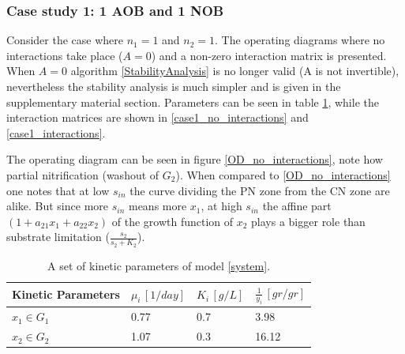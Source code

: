 \documentclass[3p,times]{article}
\begin{document}
\subsubsection{Case study 1: 1 AOB and 1 NOB}

Consider the case where $n_1 = 1$ and $n_2 = 1$. The operating diagrams where no interactions take place ($A = 0$) and a non-zero interaction matrix is presented. When $A=0$ algorithm \ref{StabilityAnalysis} is no longer valid (A is not invertible), nevertheless the stability analysis is much simpler and is given in the supplementary material section. Parameters can be seen in table \ref{kinetic_parameters_case_study_1}, while the interaction matrices are shown in \ref{case1_no_interactions} and \ref{case1_interactions}.

The operating diagram can be seen in figure \ref{OD_no_interactions}, note how partial nitrification (washout of $G_2$). When compared to \ref{OD_no_interactions} one notes that at low $s_{in}$ the curve dividing the PN zone from the CN zone are alike. But since more $s_{in}$ means more $x_1$, at high $s_{in}$ the affine part $(1+ a_{21}x_1 +a_{22}x_2)$ of the growth function of $x_2$ plays a bigger role than substrate limitation ($\frac{s_2}{s_2+K_2}$).


\begin{table}[ht]
	\centering
	\begin{tabular}{|l|l|l|l|}
		\hline
		Kinetic Parameters & $\mu_i\,[1/day]$ & $K_i\,[g/L]$ & $\frac{1}{y_i} \, [gr/gr]$ \\ \hline
		$x_1 \in G_1$ & 0.77  & 0.7 & 3.98  \\ \hline
		$x_2\in G_2$ & 1.07 & 0.3 &  16.12 \\ \hline
	\end{tabular}	
	\caption{A set of kinetic parameters of model \eqref{system}.}
	\label{kinetic_parameters_case_study_1}
\end{table}
\end{document}
